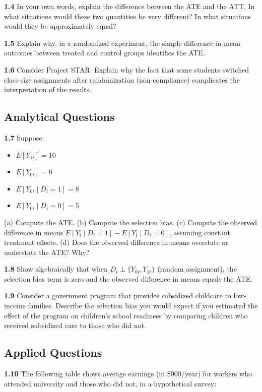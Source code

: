 \textbf{1.4} In your own words, explain the difference between the ATE and the ATT. In what situations would these two quantities be very different? In what situations would they be approximately equal?

\textbf{1.5} Explain why, in a randomized experiment, the simple difference in mean outcomes between treated and control groups identifies the ATE.

\textbf{1.6} Consider Project STAR. Explain why the fact that some students switched class-size assignments after randomization (non-compliance) complicates the interpretation of the results.

\subsection{Analytical Questions}

\textbf{1.7} Suppose:
\begin{itemize}
\item $E[Y_{1i}] = 10$
\item $E[Y_{0i}] = 6$
\item $E[Y_{0i} \mid D_i = 1] = 8$
\item $E[Y_{0i} \mid D_i = 0] = 5$
\end{itemize}

(a) Compute the ATE.
(b) Compute the selection bias.
(c) Compute the observed difference in means $E[Y_i \mid D_i = 1] - E[Y_i \mid D_i = 0]$, assuming constant treatment effects.
(d) Does the observed difference in means overstate or understate the ATE? Why?

\textbf{1.8} Show algebraically that when $D_i \perp \{Y_{0i}, Y_{1i}\}$ (random assignment), the selection bias term is zero and the observed difference in means equals the ATE.

\textbf{1.9} Consider a government program that provides subsidized childcare to low-income families. Describe the selection bias you would expect if you estimated the effect of the program on children's school readiness by comparing children who received subsidized care to those who did not.

\subsection{Applied Questions}

\textbf{1.10} The following table shows average earnings (in \$000/year) for workers who attended university and those who did not, in a hypothetical survey:

